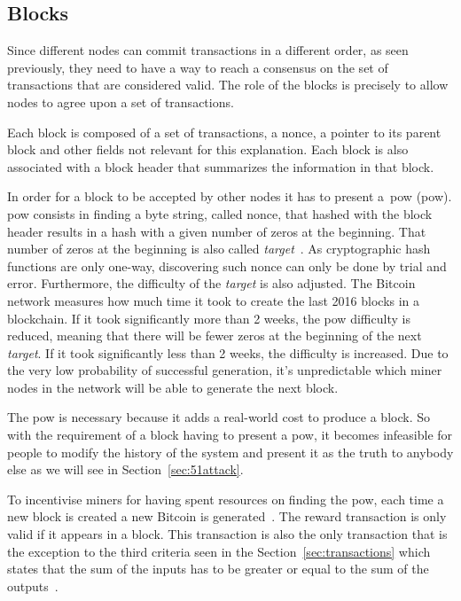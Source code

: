 \subsection{Blocks}
\label{sec:blocks}

Since different nodes can commit transactions in a different order, as seen previously, they need to have a way to reach a consensus on the set of transactions that are considered valid. The role of the blocks is precisely to allow nodes to agree upon a set of transactions.

Each block is composed of a set of transactions, a nonce, a pointer to its parent block and other fields not relevant for this explanation. Each block is also associated with a block header that summarizes the information in that block.

In order for a block to be accepted by other nodes it has to present a~\acrlong{pow} (\acrshort{pow}). \acrshort{pow} consists in finding a byte string, called nonce, that hashed with the block header results in a hash with a given number of zeros at the beginning. That number of zeros at the beginning is also called \textit{target}~\cite{decker2013information}. As cryptographic hash functions are only one-way, discovering such nonce can only be done by trial and error. Furthermore, the difficulty of the \textit{target} is also adjusted. The Bitcoin network measures how much time it took to create the last 2016 blocks in a blockchain. If it took significantly more than 2 weeks, the \acrshort{pow} difficulty is reduced, meaning that there will be fewer zeros at the beginning of the next \textit{target}. If it took significantly less than 2 weeks, the difficulty is increased. Due to the very low probability of successful generation, it's unpredictable which miner nodes in the network will be able to generate the next block.

The \acrshort{pow} is necessary because it adds a real-world cost to produce a block. So with the requirement of a block having to present a \acrshort{pow}, it becomes infeasible for people to modify the history of the system and present it as the truth to anybody else as we will see in Section~\ref{sec:51attack}.

To incentivise miners for having spent resources on finding the \acrshort{pow}, each time a new block is created a new Bitcoin is generated~\cite{decker2013information}. The reward transaction is only valid if it appears in a block. This transaction is also the only transaction that is the exception to the third criteria seen in the Section~\ref{sec:transactions} which states that the sum of the inputs has to be greater or equal to the sum of the outputs~\cite{decker2013information}.

